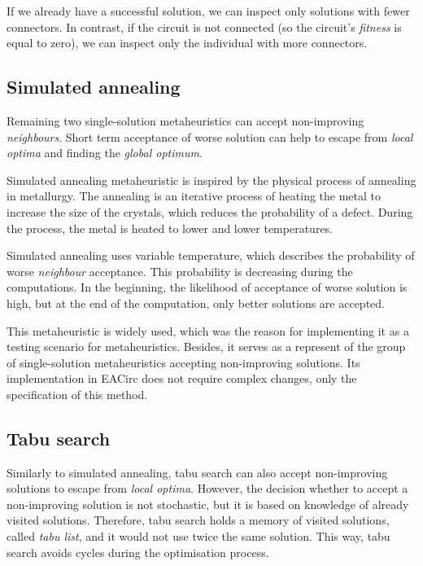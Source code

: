 \documentclass[
    digital,    %
    oneside,    %
    color,
    11pt,
    nocover,
    notable,
    nolof,
    nolot,
]{fithesis3}
\begin{document}
If we already have a successful solution, we can inspect only solutions with fewer connectors. In contrast, if the circuit is not connected (so the circuit's \textit{fitness} is equal to zero), we can inspect only the individual with more connectors.

\subsection{Simulated annealing}
\label{subsec:opt-single-sol-sa}

Remaining two single-solution metaheuristics can accept non-improving \textit{neighbours}. Short term acceptance of worse solution can help to escape from \textit{local optima} and finding the \textit{global optimum}.

Simulated annealing metaheuristic is inspired by the physical process of annealing in metallurgy. The annealing is an iterative process of heating the metal to increase the size of the crystals, which reduces the probability of a defect. During the process, the metal is heated to lower and lower temperatures.

Simulated annealing uses variable temperature, which describes the probability of worse \textit{neighbour} acceptance. This probability is decreasing during the computations. In the beginning, the likelihood of acceptance of worse solution is high, but at the end of the computation, only better solutions are accepted.

This metaheuristic is widely used, which was the reason for implementing it as a testing scenario for metaheuristics. Besides, it serves as a represent of the group of single-solution metaheuristics accepting non-improving solutions. Its implementation in EACirc does not require complex changes, only the specification of this method.


\subsection{Tabu search}
\label{subsec:opt-single-sol-tabu}

Similarly to simulated annealing, tabu search can also accept non-improving solutions to escape from \textit{local optima}. However, the decision whether to accept a non-improving solution is not stochastic, but it is based on knowledge of already visited solutions. Therefore, tabu search holds a memory of visited solutions, called \textit{tabu list}, and it would not use twice the same solution. This way, tabu search avoids cycles during the optimisation process.
\end{document}

